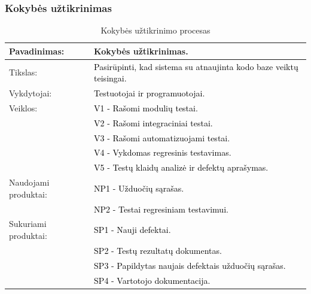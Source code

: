 \documentclass{VUMIFPSkursinis}
\begin{document}
	\subsubsection{Kokybės užtikrinimas}
	\begin{center}
		\begin{table}[ht]
			\caption{Kokybės užtikrinimo procesas}
			\begin{tabular}{ | l | l | }
				\hline
				Pavadinimas:          & Kokybės užtikrinimas.                                \\ \hline
				Tikslas:              & \textcolor{black}{Pasirūpinti, kad sistema su atnaujinta kodo baze veiktų teisingai.} \\ \hline
				Vykdytojai:	          & \textcolor{black}{Testuotojai ir programuotojai.}                       \\ \hline
				Veiklos:              & \textcolor{black}{V1 - Rašomi modulių testai.}                          \\
				                      & \textcolor{black}{V2 - Rašomi integraciniai testai.}                    \\
				                      & \textcolor{black}{V3 - Rašomi automatizuojami testai.}                  \\
				                      & \textcolor{black}{V4 - Vykdomas regresinis testavimas.}                 \\
				                      & \textcolor{black}{V5 - Testų klaidų analizė ir defektų aprašymas.}      \\ \hline
				Naudojami produktai:  & \textcolor{black}{NP1 - Užduočių sąrašas.}                              \\
				                      & \textcolor{black}{NP2 - Testai regresiniam testavimui.}                 \\ \hline
				Sukuriami produktai:  & \textcolor{black}{SP1 - Nauji defektai.}                                \\
				                      & \textcolor{black}{SP2 - Testų rezultatų dokumentas.}                    \\
				                      & \textcolor{black}{SP3 - Papildytas naujais defektais užduočių sąrašas.} \\
				                      & \textcolor{black}{SP4 - Vartotojo dokumentacija.}                       \\ \hline
			\end{tabular}
		\end{table}
	\end{center}
\end{document}

